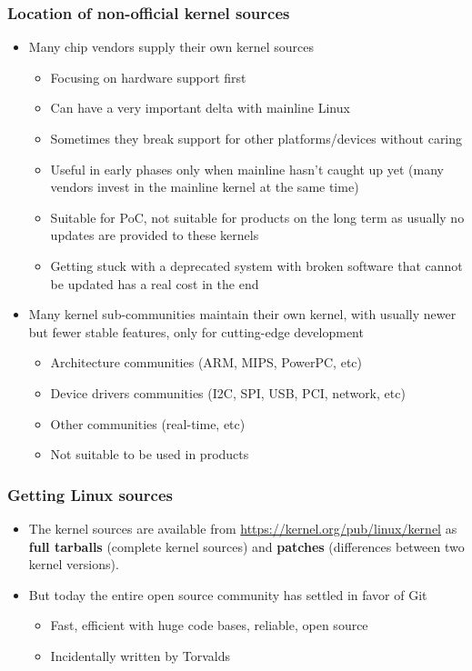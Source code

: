 \begin{frame}
  \frametitle{Location of non-official kernel sources}
  \begin{itemize}
  \item Many chip vendors supply their own kernel sources
    \begin{itemize}
    \item Focusing on hardware support first
    \item Can have a very important delta with mainline Linux
    \item Sometimes they break support for other platforms/devices
      without caring
    \item Useful in early phases only when mainline hasn't caught up yet
      (many vendors invest in the mainline kernel at the same time)
    \item Suitable for PoC, not suitable for products on the long term
      as usually no updates are provided to these kernels
    \item Getting stuck with a deprecated system with broken software
      that cannot be updated has a real cost in the end
    \end{itemize}
  \item Many kernel sub-communities maintain their own kernel, with
    usually newer but fewer stable features, only for cutting-edge
    development
    \begin{itemize}
    \item Architecture communities (ARM, MIPS, PowerPC, etc)
    \item Device drivers communities (I2C, SPI, USB, PCI, network, etc)
    \item Other communities (real-time, etc)
    \item Not suitable to be used in products
    \end{itemize}
  \end{itemize}
\end{frame}

\begin{frame}
  \frametitle{Getting Linux sources}
  \begin{itemize}
  \item The kernel sources are available from
    \url{https://kernel.org/pub/linux/kernel} as {\bf full tarballs}
    (complete kernel sources) and {\bf patches} (differences between
    two kernel versions).
  \item But today the entire open source community has settled in favor
    of Git
    \begin{itemize}
    \item Fast, efficient with huge code bases, reliable, open source
    \item Incidentally written by Torvalds
    \end{itemize}
  \end{itemize}
\end{frame}

